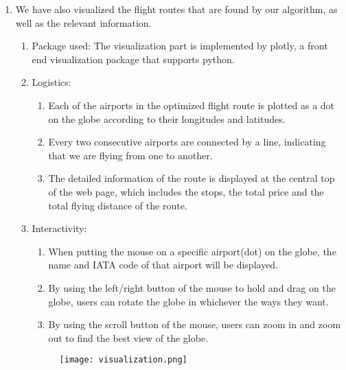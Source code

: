 \documentclass[fontsize=11pt]{article}
\begin{document}
\begin{enumerate}
\begin{enumerate}
                \item We have also visualized the flight routes that are found by our algorithm, as well as the relevant information.
                    \begin{enumerate}
                        \item Package used: The visualization part is implemented by plotly, a front end visualization package that supports python. 
                        \item Logistics: 
                        \begin{enumerate}
                            \item Each of the airports in the optimized flight route is plotted as a dot on the globe according to their longitudes and latitudes.
                            \item Every two consecutive airports are connected by a line, indicating that we are flying from one to another.
                            \item The detailed information of the route is displayed at the central top of the web page, which includes the stops, the total price and the total flying distance of the route.
                        \end{enumerate}
                        \item Interactivity: \begin{enumerate}
                            \item When putting the mouse on a specific airport(dot) on the globe, the name and IATA code of that airport will be displayed. 
                            \item By using the left/right button of the mouse to hold and drag on the globe, users can rotate the globe in whichever the ways they want.
                            \item By using the scroll button of the mouse, users can zoom in and zoom out to find the best view of the globe.
                        \end{enumerate}
            \begin{figure}[h]
                \centering
                \texttt{[image: visualization.png]}
            \end{figure}
                                    
                    \end{enumerate}
            \end{enumerate}
    
\end{enumerate}
\end{document}
